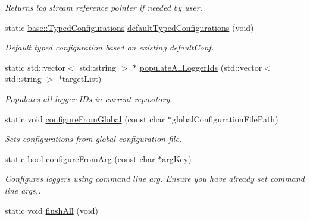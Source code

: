 \begin{DoxyCompactItemize}
\begin{DoxyCompactList}\small\item\em Returns log stream reference pointer if needed by user. \end{DoxyCompactList}\item 
static \hyperlink{classel_1_1base_1_1TypedConfigurations}{base\+::\+Typed\+Configurations} \hyperlink{classel_1_1Loggers_af296007c3eb3b71602ec80ff59875b46}{default\+Typed\+Configurations} (void)\hypertarget{classel_1_1Loggers_af296007c3eb3b71602ec80ff59875b46}{}\label{classel_1_1Loggers_af296007c3eb3b71602ec80ff59875b46}

\begin{DoxyCompactList}\small\item\em Default typed configuration based on existing default\+Conf. \end{DoxyCompactList}\item 
static std\+::vector$<$ std\+::string $>$ $\ast$ \hyperlink{classel_1_1Loggers_adea07ec6cbc1dfc50f939d69dcac7160}{populate\+All\+Logger\+Ids} (std\+::vector$<$ std\+::string $>$ $\ast$target\+List)
\begin{DoxyCompactList}\small\item\em Populates all logger I\+Ds in current repository. \end{DoxyCompactList}\item 
static void \hyperlink{classel_1_1Loggers_a9992995a85745639aa9aa5a2df2255f5}{configure\+From\+Global} (const char $\ast$global\+Configuration\+File\+Path)\hypertarget{classel_1_1Loggers_a9992995a85745639aa9aa5a2df2255f5}{}\label{classel_1_1Loggers_a9992995a85745639aa9aa5a2df2255f5}

\begin{DoxyCompactList}\small\item\em Sets configurations from global configuration file. \end{DoxyCompactList}\item 
static bool \hyperlink{classel_1_1Loggers_a28acf6f2b1ea7e5edd1b2560cde82406}{configure\+From\+Arg} (const char $\ast$arg\+Key)
\begin{DoxyCompactList}\small\item\em Configures loggers using command line arg. Ensure you have already set command line args,. \end{DoxyCompactList}\item 
static void \hyperlink{classel_1_1Loggers_a1834480e970c16817459ca3ee26b44b5}{flush\+All} (void)\hypertarget{classel_1_1Loggers_a1834480e970c16817459ca3ee26b44b5}{}\label{classel_1_1Loggers_a1834480e970c16817459ca3ee26b44b5}


\end{DoxyCompactItemize}
